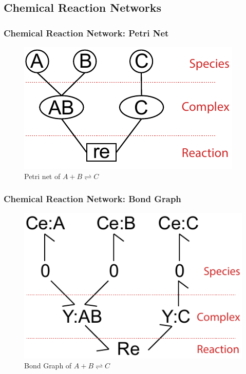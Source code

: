 \documentclass[10pt,reqno]{beamer}
\begin{document}
\subsection{Chemical Reaction Networks}
\begin{frame}
\frametitle{Chemical Reaction Network: Petri Net}
\begin{figure}
	\includegraphics{images/petrinet_abc}
	\caption{Petri net of $A+B \rightleftharpoons C$}
\end{figure}
\end{frame}
\begin{frame}
\frametitle{Chemical Reaction Network: Bond Graph}
\begin{figure}
	\includegraphics{images/bondgraph_abc}
	\caption{Bond Graph of $A+B \rightleftharpoons C$}
\end{figure}
\end{frame}
\end{document}
